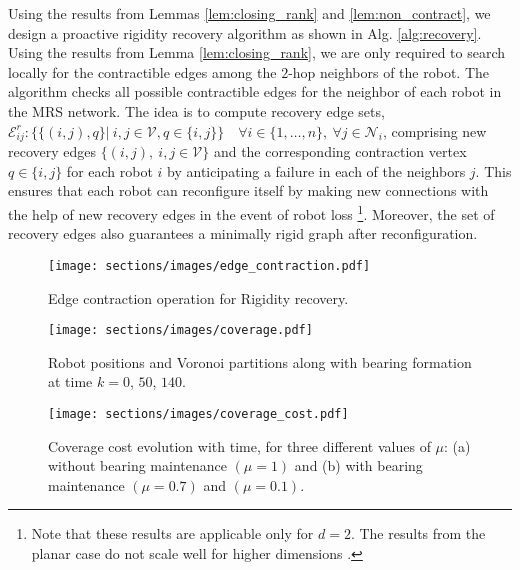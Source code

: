 Using the results from Lemmas \ref{lem:closing_rank} and \ref{lem:non_contract}, we design a proactive rigidity recovery algorithm as shown in Alg. \ref{alg:recovery}. Using the results from Lemma \ref{lem:closing_rank}, we are only required to search locally for the contractible edges among the $2$-hop neighbors of the robot. The algorithm checks all possible contractible edges for the neighbor of each robot in the MRS network. The idea is to compute recovery edge sets, $\mathcal{E}^r_{ij}: \big\{ \{(i,j), q\} | \ i,j \in \mathcal{V}, q \in \{i,j\} \big\} \quad \forall i \in \{1,\dots,n\},  \ \forall j \in \mathcal{N}_i$, comprising new recovery edges $\big\{(i,j), \ i,j \in \mathcal{V}\big\}$ and the corresponding contraction vertex $q \in \{i,j\}$ for each robot $i$ by anticipating a failure in each of the neighbors $j$. This ensures that each robot can reconfigure itself by making new connections with the help of new recovery edges in the event of robot loss \footnote{Note that these results are applicable only for $d=2$. The results from the planar case do not scale well for higher dimensions \cite{fidan2010closing}.}. Moreover, the set of recovery edges also guarantees a minimally rigid graph after reconfiguration. 
\begin{figure}[h]
\centering
\texttt{[image: sections/images/edge\_contraction.pdf]}
\caption{Edge contraction operation for Rigidity recovery.}
\label{fig:closing_rank}
\end{figure} 
\begin{figure*}[t]
\centering
        \centering
        \texttt{[image: sections/images/coverage.pdf]}
\caption{Robot positions and Voronoi partitions along with bearing formation at time $k=0$, $50$, $140$.}
\label{fig:coverage}
\end{figure*}
\begin{figure}[ht]
\centering
\texttt{[image: sections/images/coverage\_cost.pdf]}
\caption{Coverage cost evolution with time, for three different values of $\mu$: (a) without bearing maintenance $(\mu = 1)$ and (b) with bearing maintenance $(\mu = 0.7)$ and $(\mu = 0.1)$.}
\label{fig:cost}
\end{figure} 